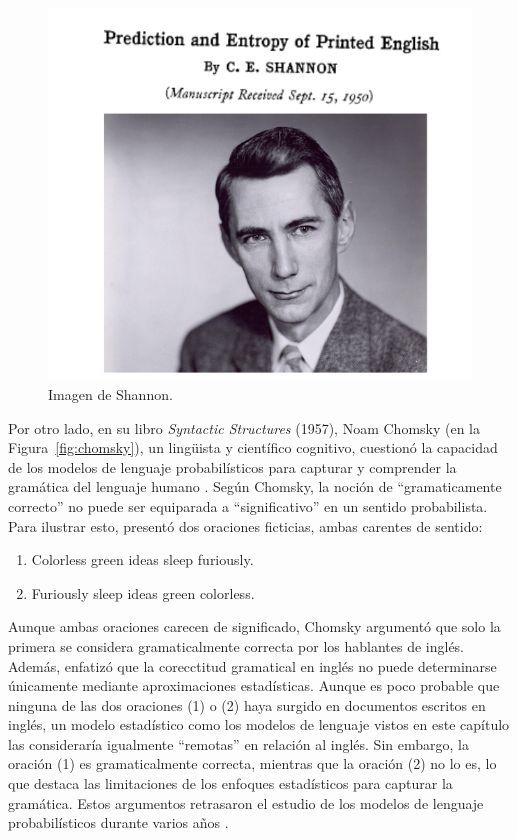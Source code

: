 \begin{figure}[h]
    \centering
    \includegraphics[scale = 0.4]{pics/shannon.png}
    \caption{Imagen de Shannon.}
    \label{fig:shannon}
\end{figure}

Por otro lado, en su libro \textit{Syntactic Structures} (1957), Noam Chomsky (en la Figura~\ref{fig:chomsky}), un lingüista y científico cognitivo, cuestionó la capacidad de los modelos de lenguaje probabilísticos para capturar y comprender la gramática del lenguaje humano \cite{chomsky2009syntactic}. Según Chomsky, la noción de ``gramaticamente correcto'' no puede ser equiparada a ``significativo'' en un sentido probabilista. Para ilustrar esto, presentó dos oraciones ficticias, ambas carentes de sentido:

\begin{enumerate}
    \item Colorless green ideas sleep furiously.
    \item Furiously sleep ideas green colorless.
\end{enumerate}

Aunque ambas oraciones carecen de significado, Chomsky argumentó que solo la primera se considera gramaticalmente correcta por los hablantes de inglés. Además, enfatizó que la corecctitud gramatical en inglés no puede determinarse únicamente mediante aproximaciones estadísticas. Aunque es poco probable que ninguna de las dos oraciones (1) o (2) haya surgido en documentos escritos en inglés, un modelo estadístico como los modelos de lenguaje vistos en este capítulo las consideraría igualmente ``remotas'' en relación al inglés. Sin embargo, la oración (1) es gramaticalmente correcta, mientras que la oración (2) no lo es, lo que destaca las limitaciones de los enfoques estadísticos para capturar la gramática. Estos argumentos retrasaron el estudio de los modelos de lenguaje probabilísticos durante varios años \cite{JurafskyBook}.


